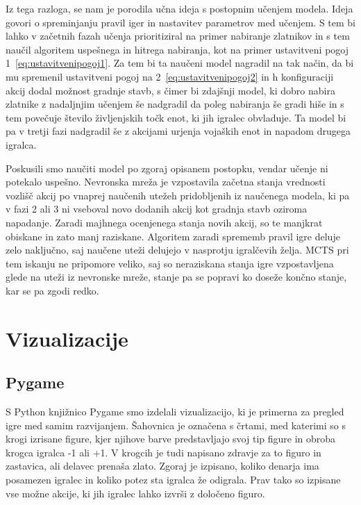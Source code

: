 \documentclass[a4paper, 12pt]{book}
\begin{document}
Iz tega razloga, se nam je porodila učna ideja s postopnim učenjem modela. 
Ideja govori o spreminjanju pravil iger in nastavitev parametrov med učenjem.
S tem bi lahko v začetnih fazah učenja prioritiziral na primer nabiranje zlatnikov in s tem naučil algoritem uspešnega in hitrega nabiranja, kot na primer ustavitveni pogoj 1~\ref{eq:ustavitvenipogoj1}.
Za tem bi ta naučeni model nagradil na tak način, da bi mu spremenil ustavitveni pogoj na 2~\ref{eq:ustavitvenipogoj2} in h konfiguraciji akcij dodal možnost gradnje stavb, s čimer bi zdajšnji model, ki dobro nabira zlatnike z nadaljnjim učenjem še nadgradil da poleg nabiranja še gradi hiše in s tem povečuje število življenjskih točk enot, ki jih igralec obvladuje.
Ta model bi pa v tretji fazi nadgradil še z akcijami urjenja vojaških enot in napadom drugega igralca.

Poskusili smo naučiti model po zgoraj opisanem postopku, vendar učenje ni potekalo uspešno.
Nevronska mreža je vzpostavila začetna stanja vrednosti vozlišč akcij po vnaprej naučenih utežeh pridobljenih iz naučenega modela, ki pa v fazi 2 ali 3 ni vseboval novo dodanih akcij kot gradnja stavb oziroma napadanje.
Zaradi majhnega ocenjenega stanja novih akcij, so te manjkrat obiskane in zato manj raziskane.
Algoritem zaradi sprememb pravil igre deluje zelo naključno, saj naučene uteži delujejo v nasprotju igralčevih želja.
MCTS pri tem iskanju ne pripomore veliko, saj so neraziskana stanja igre vzpostavljena glede na uteži iz nevronske mreže, stanje pa se popravi ko doseže končno stanje, kar se pa zgodi redko.

\chapter{Vizualizacije}
\label{chvizualizacija}

\section{Pygame}
S Python knjižnico Pygame smo izdelali vizualizacijo, ki je primerna za pregled igre med samim razvijanjem. 
Šahovnica je označena s črtami, med katerimi so s krogi izrisane figure, kjer njihove barve predstavljajo svoj tip figure in obroba krogca igralca -1 ali +1.
V krogcih je tudi napisano zdravje za to figuro in zastavica, ali delavec prenaša zlato.
Zgoraj je izpisano, koliko denarja ima posamezen igralec in koliko potez sta igralca že odigrala. 
Prav tako so izpisane vse možne akcije, ki jih igralec lahko izvrši z določeno figuro.
\end{document}
